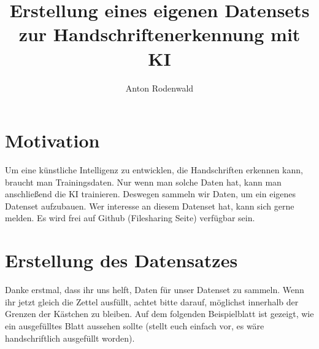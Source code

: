 \documentclass[12pt, a4paper]{article}
\begin{document}
\author{Anton Rodenwald}
\title{Erstellung eines eigenen Datensets zur Handschriftenerkennung mit KI}
\date{}

\maketitle

\thispagestyle{empty}


\section{Motivation}
Um eine künstliche Intelligenz zu entwicklen, die Handschriften erkennen kann,
braucht man Trainingsdaten. Nur wenn man solche Daten hat, kann man
anschließend die KI trainieren. Deswegen sammeln wir Daten,
um ein eigenes Datenset aufzubauen.
Wer interesse an diesem Datenset hat, kann sich gerne melden.
Es wird frei auf Github (Filesharing Seite) verfügbar sein.

\section{Erstellung des Datensatzes}
Danke erstmal, dass ihr uns helft, Daten für unser Datenset zu sammeln.
Wenn ihr jetzt gleich die Zettel ausfüllt, achtet bitte darauf, möglichst
innerhalb der Grenzen der Kästchen zu bleiben.
Auf dem folgenden Beispielblatt ist gezeigt, wie ein ausgefülltes Blatt
aussehen sollte (stellt euch einfach vor, es wäre handschriftlich ausgefüllt
worden).
\end{document}
